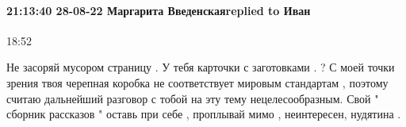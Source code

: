  
 
 
 
 

\paragraph{21:13:40 28-08-22 Маргарита Введенскаяreplied to Иван}
18:52

Не засоряй мусором страницу . У тебя карточки с заготовками . ? С моей точки
зрения твоя черепная коробка не соответствует мировым стандартам , поэтому
считаю дальнейший разговор с тобой на эту тему нецелесообразным. Свой " сборник
рассказов " оставь при себе , проплывай мимо , неинтересен, нудятина .
